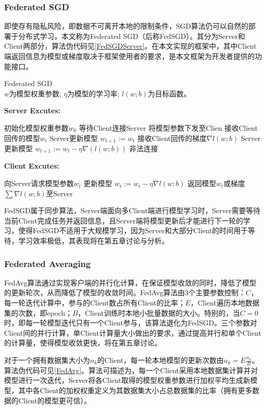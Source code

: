 \documentclass[zihao = -4,cn]{oucart}
\begin{document}
\subsubsection{Federated SGD}
即使存有隐私风险，即数据不可离开本地的限制条件，SGD算法仍可以自然的部署于分布式学习，本文称为Federated SGD（后称FedSGD）。其分为Server和Client两部分，算法伪代码见\ref{FedSGDServer}。在本文实现的框架中，其中Client端返回信息为模型或梯度取决于框架使用者的要求，是本文框架为开发者提供的功能接口。\par

\begin{algorithm}[h]
	\caption{Federated SGD
		\\$w$为模型权重参数; $\eta$为模型的学习率; $l(w;b)$为目标函数。}
	\label{FedSGDServer}
	{\bfseries Server Excutes:}
	\begin{algorithmic}
		\STATE 初始化模型权重参数$w_0$
		\REPEAT
		\STATE 等待Client连接Server
		\STATE 将模型参数下发至Clien
		\STATE 接收Client回传的模型$w_t$
		\STATE Server更新模型 $w_{t+1} := w_{t}$
		\STATE 接收Client回传的梯度$\nabla{l(w;b)}$
		\STATE Server更新模型 $w_{t+1} := w_t - \eta\nabla(l(w;b))$
		\ELSE
		\STATE 非法连接
		\ENDIF
	\end{algorithmic}
	{\bfseries Client Excutes:}
	\begin{algorithmic}
		\STATE 向Server请求模型参数$w_t$
		\FOR{batch $b \in B$}
		\STATE 更新模型 $w_t := w_t-\eta\nabla{l(w;b)}$
		\ENDFOR
		\STATE 返回模型$w_t$或梯度$\sum{\nabla{l(w;b)}}$至Server 
	\end{algorithmic}
\end{algorithm}

FedSGD属于同步算法，Server端面向多Client端进行模型学习时，Server需要等待当前Client完成任务并返回信息，且Server端将模型更新后才能进行下一轮的学习，使得FedSGD不适用于大规模学习，因为Server和大部分Client的时间用于等待，学习效率极低，其表现将在第五章讨论与分析。

%
\subsubsection{Federated Averaging}
FedAvg算法通过实现客户端的并行化计算，在保证模型收敛的同时，降低了模型的更新轮次，从而降低了模型的收敛时间。FedAvg算法由3个主要参数控制：$C$，每一轮迭代计算中，参与的Client数占所有Client的比率；$E$，Client遍历本地数据集的次数，即epoch；$B$，Client训练时本地小批量数据的大小。特别的，当$C=0$时，即每一轮模型迭代只有一个Client参与，该算法退化为FedSGD。三个参数对Client间的并行计算，单Client计算量大小做出的要求，通过提高并行和单个Client的计算量，使得模型收敛更快，将在第五章讨论。\par
对于一个拥有数据集大小为$n_k$的Client，每一轮本地模型的更新次数由$u_k = E\frac{n_k}{B}$。算法伪代码可见\ref{FedAvg}。算法可描述为，每一个Client采用本地数据集计算并对模型进行一次迭代，Server将各Client取得的模型权重参数进行加权平均生成新模型，其中各Client的加权权重定义为其数据集大小占总数据集的比率（拥有更多数据的Client的模型更可信）。
%
\end{document}
